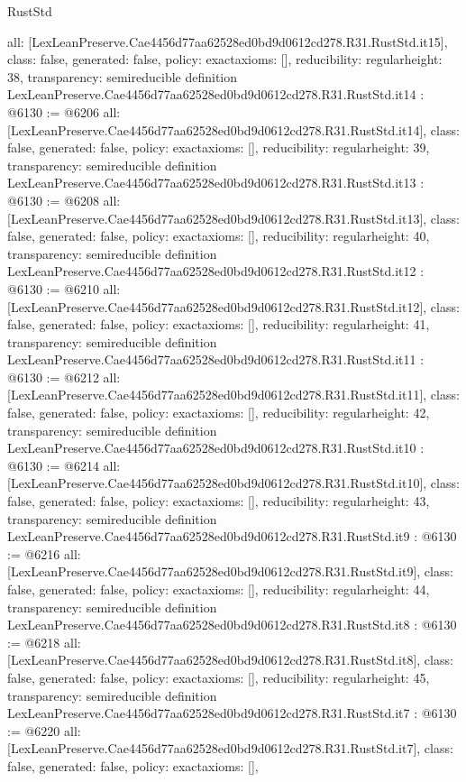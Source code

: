 \begin{lexlean}{RustStd}
\begin{coremodule}
{  all: [LexLeanPreserve.Cae4456d77aa62528ed0bd9d0612cd278.R31.RustStd.it15],
  class: false,
  generated: false,
  policy: exact{axioms: []},
  reducibility: regular{height: 38},
  transparency: semireducible
}
definition LexLeanPreserve.Cae4456d77aa62528ed0bd9d0612cd278.R31.RustStd.it14 : @6130 := @6206 {
  all: [LexLeanPreserve.Cae4456d77aa62528ed0bd9d0612cd278.R31.RustStd.it14],
  class: false,
  generated: false,
  policy: exact{axioms: []},
  reducibility: regular{height: 39},
  transparency: semireducible
}
definition LexLeanPreserve.Cae4456d77aa62528ed0bd9d0612cd278.R31.RustStd.it13 : @6130 := @6208 {
  all: [LexLeanPreserve.Cae4456d77aa62528ed0bd9d0612cd278.R31.RustStd.it13],
  class: false,
  generated: false,
  policy: exact{axioms: []},
  reducibility: regular{height: 40},
  transparency: semireducible
}
definition LexLeanPreserve.Cae4456d77aa62528ed0bd9d0612cd278.R31.RustStd.it12 : @6130 := @6210 {
  all: [LexLeanPreserve.Cae4456d77aa62528ed0bd9d0612cd278.R31.RustStd.it12],
  class: false,
  generated: false,
  policy: exact{axioms: []},
  reducibility: regular{height: 41},
  transparency: semireducible
}
definition LexLeanPreserve.Cae4456d77aa62528ed0bd9d0612cd278.R31.RustStd.it11 : @6130 := @6212 {
  all: [LexLeanPreserve.Cae4456d77aa62528ed0bd9d0612cd278.R31.RustStd.it11],
  class: false,
  generated: false,
  policy: exact{axioms: []},
  reducibility: regular{height: 42},
  transparency: semireducible
}
definition LexLeanPreserve.Cae4456d77aa62528ed0bd9d0612cd278.R31.RustStd.it10 : @6130 := @6214 {
  all: [LexLeanPreserve.Cae4456d77aa62528ed0bd9d0612cd278.R31.RustStd.it10],
  class: false,
  generated: false,
  policy: exact{axioms: []},
  reducibility: regular{height: 43},
  transparency: semireducible
}
definition LexLeanPreserve.Cae4456d77aa62528ed0bd9d0612cd278.R31.RustStd.it9 : @6130 := @6216 {
  all: [LexLeanPreserve.Cae4456d77aa62528ed0bd9d0612cd278.R31.RustStd.it9],
  class: false,
  generated: false,
  policy: exact{axioms: []},
  reducibility: regular{height: 44},
  transparency: semireducible
}
definition LexLeanPreserve.Cae4456d77aa62528ed0bd9d0612cd278.R31.RustStd.it8 : @6130 := @6218 {
  all: [LexLeanPreserve.Cae4456d77aa62528ed0bd9d0612cd278.R31.RustStd.it8],
  class: false,
  generated: false,
  policy: exact{axioms: []},
  reducibility: regular{height: 45},
  transparency: semireducible
}
definition LexLeanPreserve.Cae4456d77aa62528ed0bd9d0612cd278.R31.RustStd.it7 : @6130 := @6220 {
  all: [LexLeanPreserve.Cae4456d77aa62528ed0bd9d0612cd278.R31.RustStd.it7],
  class: false,
  generated: false,
  policy: exact{axioms: []},
}
\end{coremodule}
\end{lexlean}
